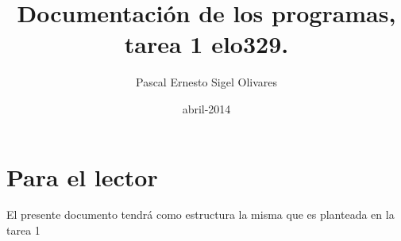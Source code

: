 \documentclass[a4paper,10pt]{article}
\title{Documentación de los programas, tarea 1 elo329.}
\author{Pascal Ernesto Sigel Olivares}
\date{abril-2014}
\begin{document}
\maketitle
\newpage
\section{Para el lector}
El presente documento tendrá como estructura la misma que es planteada en la tarea 1
\end{document}
